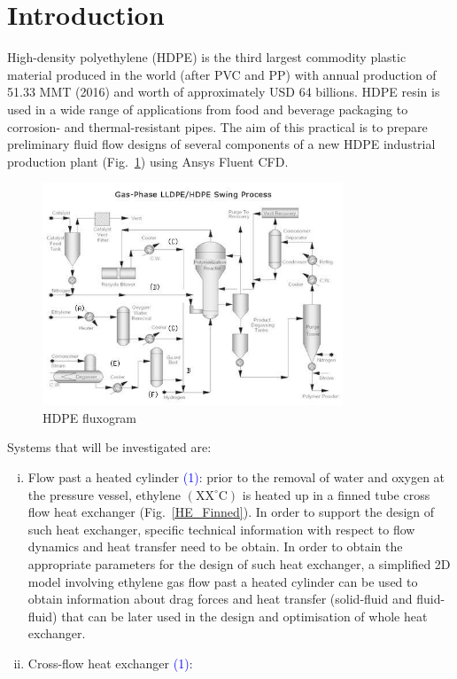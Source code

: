 \documentclass[12pts,a4paper,amsmath,amssymb,floatfix]{article}%
\newcommand{\blue}{\textcolor{blue}}
\begin{document}
\section{Introduction}
High-density polyethylene (HDPE) is the third largest commodity plastic material produced in the world (after PVC and PP) with annual production of 51.33 MMT (2016) and worth of approximately USD 64 billions. HDPE resin is used in a wide range of applications from food and beverage packaging to corrosion- and thermal-resistant pipes. The aim of this practical is to prepare preliminary fluid flow designs of several components of a new HDPE industrial production plant (Fig.~\ref{HDPE_Plant}) using Ansys Fluent CFD.   

\begin{figure}[H]
  \begin{center}
     \includegraphics[width=0.8\textwidth,clip]{./Pics/hdpe_production_img2.jpg}
     \caption{HDPE fluxogram}\label{HDPE_Plant}
  \end{center}
\end{figure}

Systems that will be investigated are:
\begin{enumerate}[i)]
   \item Flow past a heated cylinder \blue{(1)}: prior to the removal of water and oxygen at the pressure vessel, ethylene $\left(\text{XX}^{\circ}\text{C}\right)$ is heated up in a finned tube cross flow heat exchanger (Fig.~\ref{HE_Finned}). In order to support the design of such heat exchanger, specific technical information with respect to flow dynamics and heat transfer need to be obtain. In order to obtain the appropriate parameters for the design of such heat exchanger, a simplified 2D model involving ethylene gas flow past a heated cylinder can be used to obtain information about drag forces and heat transfer (solid-fluid and fluid-fluid) that can be later used in the design and optimisation of whole heat exchanger.
   \item Cross-flow heat exchanger \blue{(1)}: 
\end{enumerate}
\end{document}
